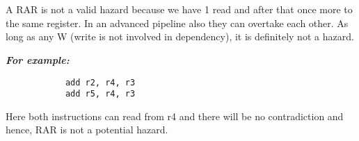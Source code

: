 \documentclass[12pt]{article}
\begin{document}
\section{}
A RAR is not a valid hazard because we have 1 read and after that once more to the same register. In an advanced pipeline also they can overtake each other. As long as any W (write is not involved in dependency), it is definitely not a hazard.

\textbf{\textit{For example:}}
        \begin{verbatim}
            add r2, r4, r3
            add r5, r4, r3
        \end{verbatim}
        Here both instructions can read from r4 and there will be no contradiction and hence, RAR is not a potential hazard.
\end{document}
